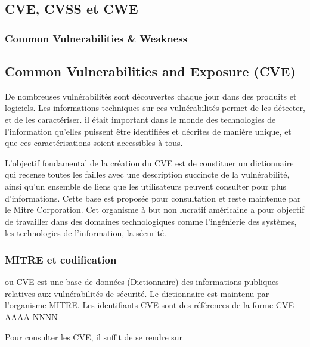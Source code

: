 \uchap{\jobname}

\subsection{CVE, CVSS et CWE}

\begin{frame}
\frametitle<presentation>{Common Vulnerabilities \& Weakness}
\end{frame}

\subsection{Common Vulnerabilities and Exposure (CVE)}

De nombreuses vulnérabilités sont découvertes chaque jour dans des produits et logiciels. Les informations techniques sur ces vulnérabilités permet de les détecter, et de les caractériser. il était important dans le monde des technologies de l'information qu'elles puissent être identifiées et décrites de manière unique, et que ces caractérisations soient accessibles à tous.

L’objectif fondamental de la création du CVE est de constituer un dictionnaire qui recense toutes les failles avec une description succincte de la vulnérabilité, ainsi qu’un ensemble de liens que les utilisateurs peuvent consulter pour plus d’informations. Cette base  est proposée pour consultation et reste maintenue par le Mitre Corporation.  Cet organisme à but non lucratif américaine a pour  objectif de travailler dans des domaines technologiques comme l'ingénierie des systèmes, les technologies de l'information, la sécurité. 



\begin{frame}
\frametitle<presentation>{MITRE et codification}
 ou CVE est une base de données (Dictionnaire) des informations publiques relatives aux vulnérabilités de sécurité. Le dictionnaire est maintenu par l'organisme MITRE.  Les identifiants CVE sont des références de la forme CVE-AAAA-NNNN 
 
 Pour consulter les CVE,  il suffit de se rendre sur 

\end{frame}

